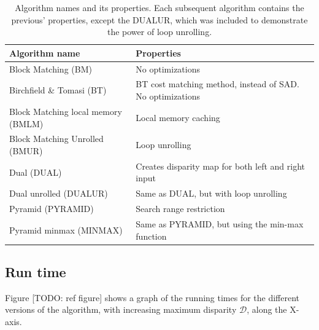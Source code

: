 \begin{table}
  \begin{tabular}{|l|l|}
    \hline
    Algorithm name                     & Properties                                               \\
    \hline
    Block Matching (BM)                & No optimizations                                         \\
    Birchfield \& Tomasi (BT)          & BT cost matching method, instead of SAD. No optimizations\\
    Block Matching local memory (BMLM) & Local memory caching                                     \\
    Block Matching Unrolled (BMUR)     & Loop unrolling                                           \\
    Dual (DUAL)                        & Creates disparity map for both left and right input      \\
    Dual unrolled (DUALUR)             & Same as DUAL, but with loop unrolling                    \\
    Pyramid (PYRAMID)                  & Search range restriction                                 \\
    Pyramid minmax (MINMAX)            & Same as PYRAMID, but using the min-max function          \\
    \hline
  \end{tabular}
  \caption{Algorithm names and its properties. Each subsequent
    algorithm contains the previous' properties, except the DUALUR,
    which was included to demonstrate the power of loop unrolling.}
  \label{algorithm-name-table}
\end{table}


\subsection{Run time}

Figure [TODO: ref figure] shows a graph of the running times for the different
versions of the algorithm, with increasing maximum disparity $\mathcal{D}$,
along the X-axis.

